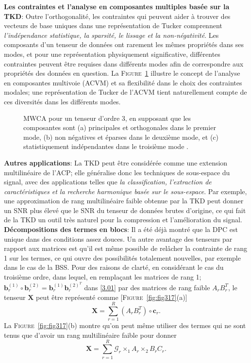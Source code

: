 \documentclass[11pt,a4paper,oneside]{book}
\newcommand{\encad}[1]{%
 \fbox{\begin{minipage}[t]{\linewidth}%
  #1\end{minipage}}}
\def\b{\mathbf b}
\newcommand{\mbf}[1]{\mathbf{#1}}
\newcommand{\figref}[1]{\textsc{Figure}~\ref{#1}}
\begin{document}
 \textbf{Les contraintes et l'analyse en composantes multiples basée sur la TKD}: Outre l'orthogonalité, les contraintes qui peuvent aider à trouver des vecteurs de base uniques dans une représentation de Tucker comprennent \textit{l'indépendance statistique, la sparsité, le lissage et la non-négativité}. Les composants d'un tenseur de données ont rarement les mêmes propriétés dans ses modes, et pour une représentation physiquement significative, différentes contraintes peuvent être requises dans différents modes afin de correspondre aux propriétés des données en question. La \figref{fig:fig316} illustre le concept de l'analyse en composantes multivoie (ACVM) et sa flexibilité dans le choix des contraintes modales; une représentation de Tucker de l'ACVM tient naturellement compte de ces diversités dans les différents modes.
 
 \begin{figure}[!h]
 \encad{\centering
 	\texttt{[image: "My figures/FIG316"]}}
 	\caption{MWCA pour un tenseur d'ordre 3, en supposant que les composantes sont (a) principales et orthogonales dans le premier mode, (b) non négatives et éparses dans le deuxième mode, et (c) statistiquement indépendantes dans le troisième mode  \cite[p.147]{cichocki2015tensor}.}
 	\label{fig:fig316}
 \end{figure}
 
 \textbf{Autres applications}: La TKD peut être considérée comme une extension multilinéaire de l'ACP; elle généralise donc les techniques de sous-espace du signal, avec des applications telles que \textit{la classification, l'extraction de caractéristiques et la recherche harmonique basée sur le sous-espace}. Par exemple, une approximation de rang multilinéaire faible obtenue par la TKD peut donner un SNR plus élevé que le SNR du tenseur de données brutes d'origine, ce qui fait de la TKD un outil très naturel pour la compression et l'amélioration du signal.\\
 
 
 \textbf{Décompositions des termes en blocs}: Il a été déjà montré que la DPC est unique dans des conditions assez douces. Un autre avantage des tenseurs par rapport aux matrices est qu'il est même possible de relâcher la contrainte de rang 1 sur les termes, ce qui ouvre des possibilités totalement nouvelles, par exemple dans le cas de la BSS. Pour des raisons de clarté, en  considérant le cas du troisième ordre, dans lequel, en remplaçant les matrices de rang 1; $ \b_{r}^{(1)}\circ\b_{r}^{(2)}=\b_{r}^{(1)}\b_{r}^{(2)^{T}} $ dans \eqref{3.01} par des matrices de rang faible
 $ A_{r}B_{r}^{T} $, le tenseur $ \mbf{X} $ peut être représenté comme [\figref{fig:fig317}(a)]
 \begin{equation}\label{11}
 \mbf{X}=\sum_{r=1}^{R}\left(A_{r}B_{r}^{T}\right)\circ\mbf{c}_{r}.
 \end{equation}
 La \figref{fig:fig317}(b) montre qu'on peut même utiliser des termes qui ne sont tenus que d'avoir un rang multilinéaire faible pour donner
 \begin{equation}\label{12}
 \mbf{X}=\sum_{r=1}^{R}\mathcal{G}_{r}\times_{1}A_{r}\times_{2}B_{r}C_{r}.
 \end{equation}
 
\end{document}
